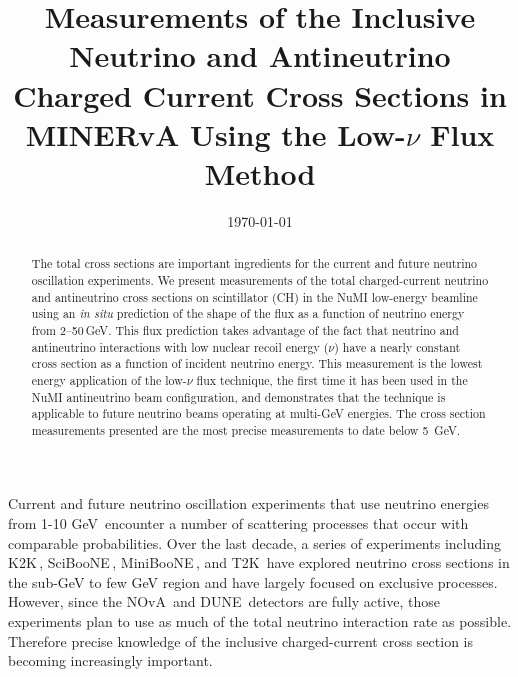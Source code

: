 \documentclass[%
reprint,
% 
superscriptaddress,
showpacs,
preprintnumbers,
showkeys,
nofootinbib,
 amsmath,amssymb,
 aps,
 prd,
floatfix,
]{revtex4-1}
\newcommand\lownu    {low-$\nu$\xspace}
\begin{document}

\title{Measurements of the Inclusive Neutrino and Antineutrino Charged Current Cross Sections in MINERvA Using the Low-$\nu$ Flux Method} 



\date{\today}%

\begin{abstract}
The total cross sections are important ingredients for the current and future neutrino oscillation experiments. We present measurements of the total charged-current neutrino and antineutrino cross sections on scintillator (CH) in the NuMI low-energy beamline using an {\em in situ} prediction of the shape of the flux as a function of neutrino energy from 2--50\,GeV. This flux prediction takes advantage of the fact that neutrino and antineutrino interactions with low nuclear recoil energy ($\nu$) have a nearly constant cross section as a function of incident neutrino energy. This measurement is the lowest energy application of the \lownu flux technique, the first time it has been used in the NuMI antineutrino beam configuration, and demonstrates that the technique is applicable to future neutrino beams operating at multi-GeV energies.  The cross section measurements presented are the most precise measurements to date below 5~GeV.  

\end{abstract}

\maketitle

Current and future neutrino oscillation experiments that use neutrino energies from 1-10 GeV\,\cite{nova-tdr,NuMI-NIM,T2K-flux,DUNE-CDR} encounter a number of scattering processes that occur with comparable probabilities. Over the last decade, a series of experiments including K2K\,\cite{K2K-QE}, SciBooNE\,\cite{sciboone-inclusive}, MiniBooNE\,\cite{miniboone-quasi}, and T2K\,\cite{T2K-xsec-2,T2K-xsec-1} have explored neutrino cross sections in the sub-GeV to few GeV region and have largely focused on exclusive processes. However, since the NOvA\,\cite{nova-tdr} and DUNE\,\cite{DUNE-CDR} detectors are fully active, those experiments plan to use as much of the total neutrino interaction rate as possible. Therefore precise knowledge of the inclusive charged-current cross section is becoming increasingly important.  
\end{document}

